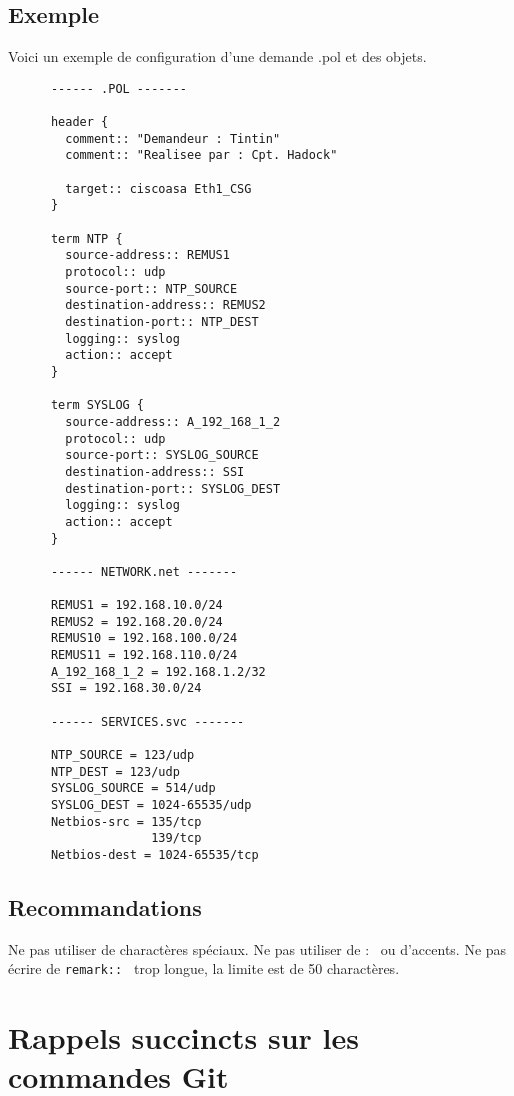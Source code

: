 \documentclass{article}
\begin{document}
    \subsection{Exemple}

      Voici un exemple de configuration d'une demande .pol et des objets. \smallbreak
\begin{verbatim}
      ------ .POL -------

      header {
        comment:: "Demandeur : Tintin"
        comment:: "Realisee par : Cpt. Hadock"

        target:: ciscoasa Eth1_CSG
      }

      term NTP {
        source-address:: REMUS1
        protocol:: udp
        source-port:: NTP_SOURCE
        destination-address:: REMUS2
        destination-port:: NTP_DEST
        logging:: syslog
        action:: accept
      }

      term SYSLOG {
        source-address:: A_192_168_1_2
        protocol:: udp
        source-port:: SYSLOG_SOURCE
        destination-address:: SSI
        destination-port:: SYSLOG_DEST
        logging:: syslog
        action:: accept
      }

      ------ NETWORK.net -------

      REMUS1 = 192.168.10.0/24
      REMUS2 = 192.168.20.0/24
      REMUS10 = 192.168.100.0/24
      REMUS11 = 192.168.110.0/24
      A_192_168_1_2 = 192.168.1.2/32
      SSI = 192.168.30.0/24

      ------ SERVICES.svc -------

      NTP_SOURCE = 123/udp
      NTP_DEST = 123/udp
      SYSLOG_SOURCE = 514/udp
      SYSLOG_DEST = 1024-65535/udp
      Netbios-src = 135/tcp
                    139/tcp
      Netbios-dest = 1024-65535/tcp
\end{verbatim}

    \subsection{Recommandations}

      Ne pas utiliser de charactères spéciaux.
      Ne pas utiliser de : \ ou d'accents.
      Ne pas écrire de \texttt{remark:: } trop longue, la limite est de 50 charactères.


  \section{Rappels succincts sur les commandes Git}
\end{document}
